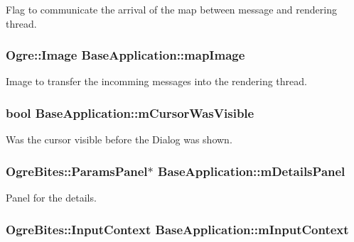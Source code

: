 \-Flag to communicate the arrival of the map between message and rendering thread. \hypertarget{classBaseApplication_a254410dc2906d4860d66d085f7217ace}{
\subsubsection[{map\-Image}]{\setlength{\rightskip}{0pt plus 5cm}\-Ogre\-::\-Image {\bf \-Base\-Application\-::map\-Image}}}\label{classBaseApplication_a254410dc2906d4860d66d085f7217ace}
\-Image to transfer the incomming messages into the rendering thread. \hypertarget{classBaseApplication_ac7e861799862cb645f1d78b170aef80d}{
\subsubsection[{m\-Cursor\-Was\-Visible}]{\setlength{\rightskip}{0pt plus 5cm}bool {\bf \-Base\-Application\-::m\-Cursor\-Was\-Visible}}}\label{classBaseApplication_ac7e861799862cb645f1d78b170aef80d}
\-Was the cursor visible before the \-Dialog was shown. \hypertarget{classBaseApplication_a6a11054ca61efdf558e0ff1b2de43a12}{
\subsubsection[{m\-Details\-Panel}]{\setlength{\rightskip}{0pt plus 5cm}\-Ogre\-Bites\-::\-Params\-Panel$\ast$ {\bf \-Base\-Application\-::m\-Details\-Panel}}}\label{classBaseApplication_a6a11054ca61efdf558e0ff1b2de43a12}
\-Panel for the details. \hypertarget{classBaseApplication_a7da63f46f2ccf2c6385723c11c03301f}{
\subsubsection[{m\-Input\-Context}]{\setlength{\rightskip}{0pt plus 5cm}\-Ogre\-Bites\-::\-Input\-Context {\bf \-Base\-Application\-::m\-Input\-Context}}}\label{classBaseApplication_a7da63f46f2ccf2c6385723c11c03301f}
